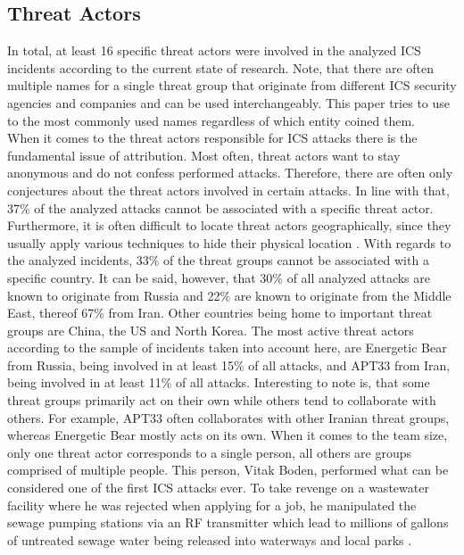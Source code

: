 \documentclass[runningheads]{llncs}
\begin{document}
\subsection{Threat Actors}
In total, at least 16 specific threat actors were involved in the analyzed ICS incidents according to the current state of research.
Note, that there are often multiple names for a single threat group that originate from different ICS security agencies and companies \cite{thaicert.19} and can be used interchangeably.
This paper tries to use to the most commonly used names regardless of which entity coined them.\\
When it comes to the threat actors responsible for ICS attacks there is the fundamental issue of attribution.
Most often, threat actors want to stay anonymous and do not confess performed attacks. %
Therefore, there are often only conjectures about the threat actors involved in certain attacks.
In line with that, 37\% of the analyzed attacks cannot be associated with a specific threat actor.
Furthermore, it is often difficult to locate threat actors geographically, since they usually apply various techniques to hide their physical location \cite{huang.18}.
With regards to the analyzed incidents, 33\% of the threat groups cannot be associated with a specific country.
It can be said, however, that 30\% of all analyzed attacks are known to originate from Russia and 22\% are known to originate from the Middle East, thereof 67\% from Iran.
Other countries being home to important threat groups are China, the US and North Korea.
The most active threat actors according to the sample of incidents taken into account here, are Energetic Bear from Russia, being involved in at least 15\% of all attacks, and APT33 from Iran, being involved in at least 11\% of all attacks.
Interesting to note is, that some threat groups primarily act on their own while others tend to collaborate with others.
For example, APT33 often collaborates with other Iranian threat groups, whereas Energetic Bear mostly acts on its own.
When it comes to the team size, only one threat actor corresponds to a single person, all others are groups comprised of multiple people.
This person, Vitak Boden, performed what can be considered one of the first ICS attacks ever.
To take revenge on a wastewater facility where he was rejected when applying for a job, he manipulated the sewage pumping stations via an RF transmitter which lead to millions of gallons of untreated sewage water being released into waterways and local parks \cite{hemsley.18}.
\end{document}
